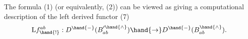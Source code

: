 The formula (1) (or equivalently, (2)) can be viewed as giving a
computational description of the left derived functor 
(7) \[ \mathrm{L}f_{\hand{!}}^{ab} : D^{\hand{-}}(B'^{\hand{\wedge}}_{ab}) \hand{\to} D^{\hand{-}}(B^{\hand{\wedge}}_{ab}). \]


